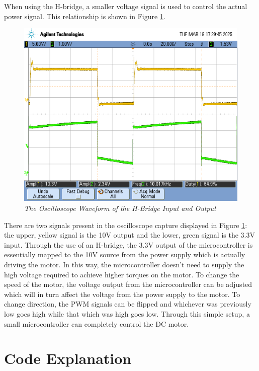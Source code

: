 \documentclass[CMPE]{KGCOEReport}
\begin{document}
When using the H-bridge, a smaller voltage signal is used to control the 
actual power signal. This relationship is shown in Figure \ref{fig:part1_2}.
\begin{figure}[H]
    \centering
    \includegraphics[width=1\textwidth]{Images/part1_2.png} %
    \caption{\textit{The Oscilloscope Waveform of the H-Bridge Input and Output}}
    \label{fig:part1_2}
\end{figure}
There are two signals present in the oscilloscope capture displayed in Figure 
\ref{fig:part1_2}: the upper, yellow signal is the 10V output and the lower, 
green signal is the 3.3V input. Through the use of an H-bridge, the 3.3V 
output of the microcontroller is essentially mapped to the 10V source from the
 power supply which is actually driving the motor. In this way, the 
 microcontroller doesn't need to supply the high voltage required to achieve 
 higher torques on the motor. To change the speed of the motor, the voltage 
 output from the microcontroller can be adjusted which will in turn affect the
  voltage from the power supply to the motor. To change direction, the PWM 
  signals can be flipped and whichever was previously low goes high while that
   which was high goes low. Through this simple setup, a small microcontroller
    can completely control the DC motor.

\section*{Code Explanation}
\end{document}
